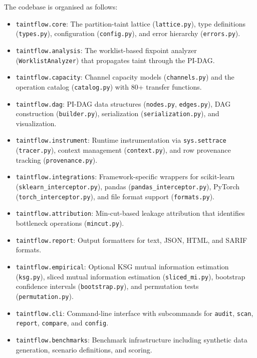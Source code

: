 \documentclass[11pt]{article}
\begin{document}
The codebase is organised as follows:
\begin{itemize}
  \item \texttt{taintflow.core}: The partition-taint lattice (\texttt{lattice.py}),
    type definitions (\texttt{types.py}), configuration (\texttt{config.py}),
    and error hierarchy (\texttt{errors.py}).
  \item \texttt{taintflow.analysis}: The worklist-based fixpoint analyzer
    (\texttt{WorklistAnalyzer}) that propagates taint through the PI-DAG.
  \item \texttt{taintflow.capacity}: Channel capacity models (\texttt{channels.py})
    and the operation catalog (\texttt{catalog.py}) with 80+ transfer functions.
  \item \texttt{taintflow.dag}: PI-DAG data structures (\texttt{nodes.py},
    \texttt{edges.py}), DAG construction (\texttt{builder.py}),
    serialization (\texttt{serialization.py}), and visualization.
  \item \texttt{taintflow.instrument}: Runtime instrumentation via
    \texttt{sys.settrace} (\texttt{tracer.py}), context management
    (\texttt{context.py}), and row provenance tracking (\texttt{provenance.py}).
  \item \texttt{taintflow.integrations}: Framework-specific wrappers for
    scikit-learn (\texttt{sklearn\_interceptor.py}), pandas
    (\texttt{pandas\_interceptor.py}), PyTorch (\texttt{torch\_interceptor.py}),
    and file format support (\texttt{formats.py}).
  \item \texttt{taintflow.attribution}: Min-cut-based leakage attribution
    that identifies bottleneck operations (\texttt{mincut.py}).
  \item \texttt{taintflow.report}: Output formatters for text, JSON, HTML,
    and SARIF formats.
  \item \texttt{taintflow.empirical}: Optional KSG mutual information
    estimation (\texttt{ksg.py}), sliced mutual information estimation
    (\texttt{sliced\_mi.py}), bootstrap confidence intervals
    (\texttt{bootstrap.py}), and permutation tests (\texttt{permutation.py}).
  \item \texttt{taintflow.cli}: Command-line interface with subcommands for
    \texttt{audit}, \texttt{scan}, \texttt{report}, \texttt{compare}, and
    \texttt{config}.
  \item \texttt{taintflow.benchmarks}: Benchmark infrastructure including
    synthetic data generation, scenario definitions, and scoring.
\end{itemize}
\end{document}
